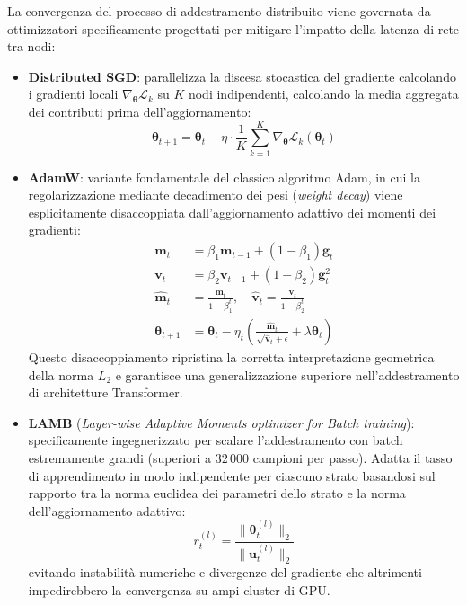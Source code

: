 \documentclass[11pt, a4paper]{article}
\begin{document}
La convergenza del processo di addestramento distribuito viene governata da ottimizzatori specificamente progettati per mitigare l'impatto della latenza di rete tra nodi:
\begin{itemize}
    \item \textbf{Distributed SGD}: parallelizza la discesa stocastica del gradiente calcolando i gradienti locali $\nabla_{\bm{\theta}} \mathcal{L}_k$ su $K$ nodi indipendenti, calcolando la media aggregata dei contributi prima dell'aggiornamento:
    \begin{equation}
        \bm{\theta}_{t+1} = \bm{\theta}_t - \eta \cdot \frac{1}{K} \sum_{k=1}^K \nabla_{\bm{\theta}} \mathcal{L}_k(\bm{\theta}_t)
    \end{equation}
    \item \textbf{AdamW}: variante fondamentale del classico algoritmo Adam, in cui la regolarizzazione mediante decadimento dei pesi (\emph{weight decay}) viene esplicitamente disaccoppiata dall'aggiornamento adattivo dei momenti dei gradienti:
    \begin{align}
        \bm{m}_t &= \beta_1 \bm{m}_{t-1} + (1 - \beta_1) \bm{g}_t \\
        \bm{v}_t &= \beta_2 \bm{v}_{t-1} + (1 - \beta_2) \bm{g}_t^2 \\
        \hat{\bm{m}}_t &= \frac{\bm{m}_t}{1 - \beta_1^t}, \quad \hat{\bm{v}}_t = \frac{\bm{v}_t}{1 - \beta_2^t} \\
        \bm{\theta}_{t+1} &= \bm{\theta}_t - \eta_t \left( \frac{\hat{\bm{m}}_t}{\sqrt{\hat{\bm{v}}_t} + \epsilon} + \lambda \bm{\theta}_t \right)
    \end{align}
    Questo disaccoppiamento ripristina la corretta interpretazione geometrica della norma $L_2$ e garantisce una generalizzazione superiore nell'addestramento di architetture Transformer.
    \item \textbf{LAMB} (\emph{Layer-wise Adaptive Moments optimizer for Batch training}): specificamente ingegnerizzato per scalare l'addestramento con batch estremamente grandi (superiori a $32\,000$ campioni per passo). Adatta il tasso di apprendimento in modo indipendente per ciascuno strato basandosi sul rapporto tra la norma euclidea dei parametri dello strato e la norma dell'aggiornamento adattivo:
    \begin{equation}
        r_t^{(l)} = \frac{\lVert \bm{\theta}_t^{(l)} \rVert_2}{\lVert \bm{u}_t^{(l)} \rVert_2}
    \end{equation}
    evitando instabilità numeriche e divergenze del gradiente che altrimenti impedirebbero la convergenza su ampi cluster di GPU.
\end{itemize}
\end{document}
